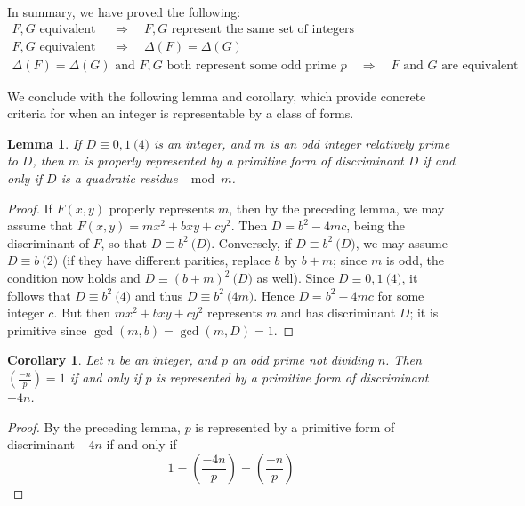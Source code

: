 \documentclass[12pt]{article}
\newcommand{\Leg}[2]{\left(\frac{#1}{#2}\right)}
\newtheorem{cor}[thm]{Corollary}
\newtheorem{lem}[thm]{Lemma}
\theoremstyle{definition}
\begin{document}
In summary, we have proved the following:
\begin{gather*}
F,G\text{ equivalent } \quad\Rightarrow\quad F,G \text{ represent the same set of integers }\\
F,G\text{ equivalent } \quad\Rightarrow\quad \Delta(F)=\Delta(G)\\
\Delta(F)=\Delta(G)\text{ and } F,G\text{ both represent some odd prime }p\quad\Rightarrow\quad F\text{ and } G\text{ are equivalent}
\end{gather*}

We conclude with the following lemma and corollary, which provide concrete criteria for when an integer is representable by a class of forms.

\begin{lem} If $D\equiv 0, 1\pod 4$ is an integer, and $m$ is an odd integer relatively prime to $D$, then $m$ is properly represented by a primitive form of discriminant $D$ if and only if $D$ is a quadratic residue $\mod m$.
\end{lem}
\begin{proof} If $F(x,y)$ properly represents $m$, then by the preceding lemma, we may assume that $F(x,y) = mx^2 + bxy + cy^2$. Then $D=b^2-4mc$, being the discriminant of $F$, so that $D \equiv b^2\pod D$. Conversely, if $D\equiv b^2\pod D$, we may assume $D\equiv b\pod 2$ (if they have different parities, replace $b$ by $b+m$; since $m$ is odd, the condition now holds and $D\equiv (b+m)^2\pod D$ as well). Since $D\equiv 0, 1\pod 4$, it follows that $D\equiv b^2\pod 4$ and thus $D\equiv b^2\pod {4m}$. Hence $D = b^2-4mc$ for some integer $c$. But then $mx^2+bxy+cy^2$ represents $m$ and has discriminant $D$; it is primitive since $\gcd(m,b) = \gcd(m,D)=1$.
\end{proof}

\begin{cor} Let $n$ be an integer, and $p$ an odd prime not dividing $n$. Then $\Leg{-n}{p}=1$ if and only if $p$ is represented by a primitive form of discriminant $-4n$.
\end{cor}
\begin{proof}
By the preceding lemma, $p$ is represented by a primitive form of discriminant $-4n$ if and only if 
\[
  1 = \Leg{-4n}{p} = \Leg{-n}{p}
\]
\end{proof}
\end{document}
